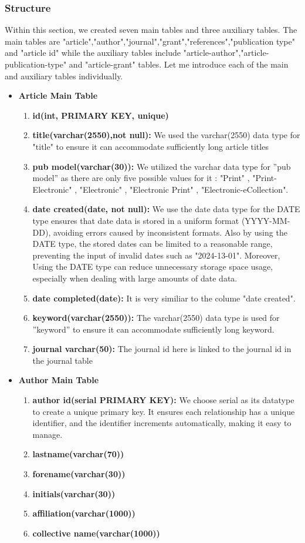 \documentclass{article}
\begin{document}
\subsubsection{Structure}
Within this section, we created seven main tables and three auxiliary tables.
The main tables are "article","author","journal","grant","references","publication type" and "article id"  while the auxiliary tables
include "article-author","article-publication-type" and "article-grant" tables. Let me introduce each of the main and auxiliary tables individually.

\begin{itemize}
\item \textbf{Article Main Table}
\begin{enumerate}
\item \textbf{id(int, PRIMARY KEY, unique)}
\item \textbf{title(varchar(2550),not null):} We used the varchar(2550) data type for "title" to ensure it can accommodate sufficiently long article titles
\item \textbf{pub model(varchar(30)):} We utilized the varchar data type for ”pub model” as there are only five possible values for it : "Print" , "Print-Electronic" , "Electronic" , "Electronic Print" , "Electronic-eCollection".
\item \textbf{date created(date, not null):} We use the date data type for the DATE type ensures that date data is stored in a uniform format (YYYY-MM-DD), avoiding errors caused by inconsistent formats. Also by using the DATE type, the stored dates can be limited to a reasonable range, preventing the input of invalid dates such as "2024-13-01". Moreover, Using the DATE type can reduce unnecessary storage space usage, especially when dealing with large amounts of date data.
\item \textbf{date completed(date):} It is very similiar to the colume "date created".
\item \textbf{keyword(varchar(2550)):} The varchar(2550) data type is used for ”keyword” to ensure it can accommodate sufficiently long keyword.
\item \textbf{journal varchar(50):} The journal id here is linked to the journal id in the journal table
\end{enumerate}

\item \textbf{Author Main Table}
\begin{enumerate}
\item \textbf{author id(serial PRIMARY KEY):} We choose serial as its datatype to create a unique primary key. It ensures each relationship
has a unique identifier, and the identifier increments automatically, making it easy to manage.
\item \textbf{lastname(varchar(70))}
\item \textbf{forename(varchar(30))}
\item \textbf{initials(varchar(30))}
\item\textbf{affiliation(varchar(1000))}
\item \textbf{collective name(varchar(1000))}  
\end{enumerate}



\end{itemize}
\end{document}
